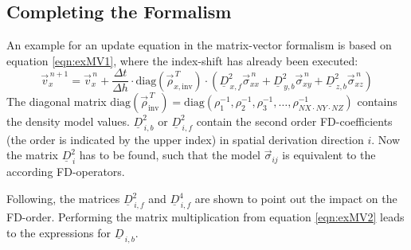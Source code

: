 \documentclass[pdftex,a4paper,parskip,listof=totoc,bibliography=totoc,onehalfspacing,12pt]{scrreprt}
\begin{document}
\subsection{Completing the Formalism}\label{sec:Mat}
An example for an update equation in the matrix-vector formalism is based on equation \ref{eqn:exMV1}, where the index-shift has already been executed:
\begin{equation}
	\vec{v}_x^{\,n+1} = \vec{v}_x^{\,n} + \frac{\Delta t}{\Delta h} \cdot \mathrm{diag} \left( \vec{\rho}_{x,\mathrm{inv}}^{\,T} \right) \cdot \left( \underline{D}_{\,x,f}^2 \vec{\sigma}_{xx}^{\,n} + \underline{D}_{\,y,b}^2 \vec{\sigma}_{xy}^{\,n} + \underline{D}_{\,z,b}^2 \vec{\sigma}_{xz}^{\,n} \right)\label{eqn:exMV2}
\end{equation}
The diagonal matrix $\mathrm{diag} \left( \vec{\rho}_\mathrm{inv}^{\,T} \right) = \mathrm{diag} \left( \rho_1^{-1}, \rho_2^{-1}, \rho_3^{-1}, \dots , \rho_{NX \cdot NY \cdot NZ}^{-1} \right)$ contains the density model values. $\underline{D}_{\,i,b}^2$ or $\underline{D}_{\,i,f}^2$ contain the second order FD-coefficients (the order is indicated by the upper index) in spatial derivation direction $i$. Now the matrix $\underline{D}_{\,i}^2$ has to be found, such that the model $\vec{\sigma}_{ij}$ is equivalent to the according FD-operators.

Following, the matrices $\underline{D}_{\,i,f}^2$ and $\underline{D}_{\,i,f}^4$ are shown to point out the impact on the FD-order. Performing the matrix multiplication from equation \ref{eqn:exMV2} leads to the expressions for $\underline{D}_{\,i,b}$.
\end{document}
